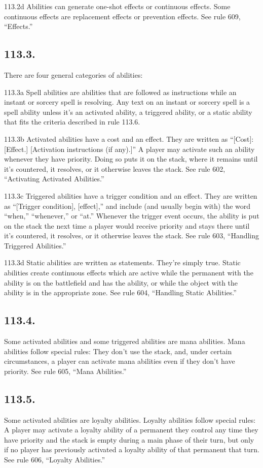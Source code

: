 113.2d Abilities can generate one-shot effects or continuous effects. Some continuous effects are replacement effects or prevention effects. See rule 609, “Effects.”

\subsection*{113.3.}
There are four general categories of abilities:

113.3a Spell abilities are abilities that are followed as instructions while an instant or sorcery spell is resolving. Any text on an instant or sorcery spell is a spell ability unless it’s an activated ability, a triggered ability, or a static ability that fits the criteria described in rule 113.6.

113.3b Activated abilities have a cost and an effect. They are written as “[Cost]: [Effect.] [Activation instructions (if any).]” A player may activate such an ability whenever they have priority. Doing so puts it on the stack, where it remains until it’s countered, it resolves, or it otherwise leaves the stack. See rule 602, “Activating Activated Abilities.”

113.3c Triggered abilities have a trigger condition and an effect. They are written as “[Trigger condition], [effect],” and include (and usually begin with) the word “when,” “whenever,” or “at.” Whenever the trigger event occurs, the ability is put on the stack the next time a player would receive priority and stays there until it’s countered, it resolves, or it otherwise leaves the stack. See rule 603, “Handling Triggered Abilities.”

113.3d Static abilities are written as statements. They’re simply true. Static abilities create continuous effects which are active while the permanent with the ability is on the battlefield and has the ability, or while the object with the ability is in the appropriate zone. See rule 604, “Handling Static Abilities.”

\subsection*{113.4.}
Some activated abilities and some triggered abilities are mana abilities. Mana abilities follow special rules: They don’t use the stack, and, under certain circumstances, a player can activate mana abilities even if they don’t have priority. See rule 605, “Mana Abilities.”

\subsection*{113.5.}
Some activated abilities are loyalty abilities. Loyalty abilities follow special rules: A player may activate a loyalty ability of a permanent they control any time they have priority and the stack is empty during a main phase of their turn, but only if no player has previously activated a loyalty ability of that permanent that turn. See rule 606, “Loyalty Abilities.”


